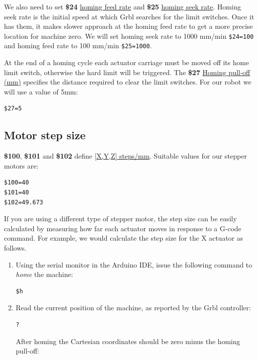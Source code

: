 \documentclass[]{book}
\theoremstyle{definition}
\theoremstyle{definition}
\theoremstyle{remark}
\begin{document}
We also need to set \textbf{\$24}
\href{https://github.com/gnea/grbl/wiki/Grbl-v1.1-Configuration\#24---homing-feed-mmmin}{homing
feed rate} and \textbf{\$25}
\href{https://github.com/gnea/grbl/wiki/Grbl-v1.1-Configuration\#25---homing-seek-mmmin}{homing
seek rate}. Homing seek rate is the initial speed at which Grbl searches
for the limit switches. Once it has them, it makes slower approach at
the homing feed rate to get a more precise location for machine zero. We
will set homing seek rate to 1000 mm/min \texttt{\$24=100} and homing
feed rate to 100 mm/min \texttt{\$25=1000}.

At the end of a homing cycle each actuator carriage must be moved off
its home limit switch, otherwise the hard limit will be triggered. The
\textbf{\$27}
\href{https://github.com/gnea/grbl/wiki/Grbl-v1.1-Configuration\#27---homing-pull-off-mm}{Homing
pull-off (mm)} specifies the distance required to clear the limit
switches. For our robot we will use a value of 5mm:

\begin{verbatim}
$27=5
\end{verbatim}

\subsection{Motor step size}\label{motor-step-size}

\textbf{\$100}, \textbf{\$101} and \textbf{\$102} define
\href{https://github.com/gnea/grbl/wiki/Grbl-v1.1-Configuration\#100-101-and-102--xyz-stepsmm}{{[}X,Y,Z{]}
steps/mm}. Suitable values for our stepper motors are:

\begin{verbatim}
$100=40
$101=40
$102=49.673
\end{verbatim}

If you are using a different type of stepper motor, the step size can be
easily calculated by measuring how far each actuator moves in response
to a G-code command. For example, we would calculate the step size for
the X actuator as follows.

\begin{enumerate}
\def\labelenumi{\arabic{enumi}.}
\item
  Using the serial monitor in the Arduino IDE, issue the following
  command to \emph{home} the machine:

\begin{verbatim}
$h
\end{verbatim}
\item
  Read the current position of the machine, as reported by the Grbl
  controller:

\begin{verbatim}
?
\end{verbatim}

  After homing the Cartesian coordinates should be zero minus the homing
  pull-off:
\end{enumerate}
\end{document}
